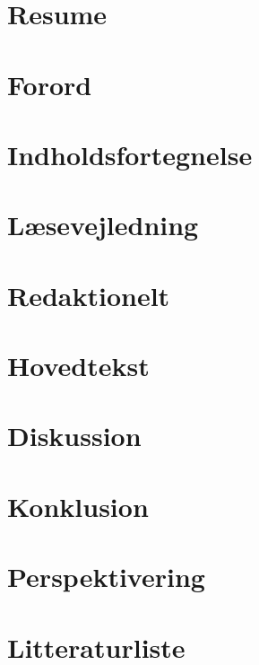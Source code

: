 \documentclass[12pt]{report}
\begin{document}



\chapter{Resume}



\chapter{Forord}

\newpage


\chapter{Indholdsfortegnelse}
\makeatletter
\renewcommand\tableofcontents{%
}
\makeatother
\tableofcontents
\pagebreak

\chapter{Læsevejledning}



\chapter{Redaktionelt}

\newpage




\chapter{Hovedtekst}







\chapter{Diskussion}



\chapter{Konklusion}



\chapter{Perspektivering}



\chapter{Litteraturliste}

\newpage
\end{document}

